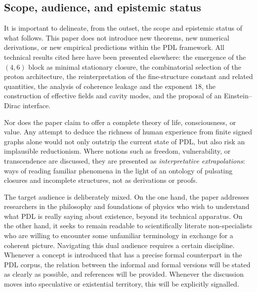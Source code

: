 \documentclass[11pt,a4paper]{article}
\theoremstyle{definition}
\begin{document}
\subsection{Scope, audience, and epistemic status}

It is important to delineate, from the outset, the scope and epistemic status of what follows. This paper does not introduce new theorems, new numerical derivations, or new empirical predictions within the PDL framework. All technical results cited here have been presented elsewhere: the emergence of the $(4,6)$ block as minimal stationary closure, the combinatorial selection of the proton architecture, the reinterpretation of the fine-structure constant and related quantities, the analysis of coherence leakage and the exponent $18$, the construction of effective fields and cavity modes, and the proposal of an Einstein--Dirac interface.\cite{Laubscher_MinimalClosures_46_2024,Laubscher_ProtonArch_v2_2024,Laubscher_Alpha_v2_2024,Laubscher_Exponent18_v2_2024,Laubscher_EffectiveFields_2024,Laubscher_CavityModes_PDL_2024,Laubscher_Einstein_Dirac_2024}

Nor does the paper claim to offer a complete theory of life, consciousness, or value. Any attempt to deduce the richness of human experience from finite signed graphs alone would not only outstrip the current state of PDL, but also risk an implausible reductionism. Where notions such as freedom, vulnerability, or transcendence are discussed, they are presented as \emph{interpretative extrapolations}: ways of reading familiar phenomena in the light of an ontology of pulsating closures and incomplete structures, not as derivations or proofs.\cite{Laubscher_Existence_PulsatingClosure_2026,Laubscher_PDL_TO_Dialogue_2024}

The target audience is deliberately mixed. On the one hand, the paper addresses researchers in the philosophy and foundations of physics who wish to understand what PDL is really saying about existence, beyond its technical apparatus. On the other hand, it seeks to remain readable to scientifically literate non-specialists who are willing to encounter some unfamiliar terminology in exchange for a coherent picture. Navigating this dual audience requires a certain discipline. Whenever a concept is introduced that has a precise formal counterpart in the PDL corpus, the relation between the informal and formal versions will be stated as clearly as possible, and references will be provided. Whenever the discussion moves into speculative or existential territory, this will be explicitly signalled.
\end{document}
